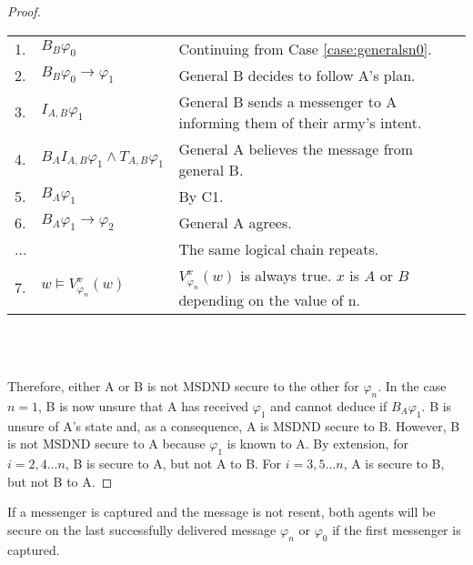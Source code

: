\begin{proof}
\begin{table}[H]
\centering
\small
\begin{tabularx}{\linewidth}{l l X}
1. & $B_{B} \varphi_0$ & Continuing from Case \ref{case:generalsn0}. \\
2. & $B_{B} \varphi_0 \rightarrow \varphi_1$ & General B decides to follow A's plan. \\
3. & $I_{A,B} \varphi_1$ & General B sends a messenger to A informing them of their army's intent. \\
4. & $B_{A}I_{A,B} \varphi_1 \wedge T_{A,B} \varphi_1$ & General A believes the message from general B. \\
5. & $B_{A}\varphi_1$ & By C1. \\
6. & $B_{A}\varphi_1 \rightarrow \varphi_2$ & General A agrees. \\
...& & The same logical chain repeats. \\
7. & $w \vDash V_{\varphi_n}^{x}(w)$ & $V_{\varphi_n}^{x}(w)$ is always true. $x$ is $A$ or $B$ depending on the value of n. %
\end{tabularx} \\~\\
\label{tab:twoarmiesproof2}
\end{table}

Therefore, either A or B is not MSDND secure to the other for $\varphi_n$.
In the case $n=1$, B is now unsure that A has received $\varphi_1$ and cannot deduce if $B_{A} \varphi_1$.
B is unsure of A's state and, as a consequence, A is MSDND secure to B.
However, B is not MSDND secure to A because $\varphi_1$ is known to A. By extension, for $i=2,4...n$, B is secure to A, but not A to B. For $i=3,5...n$, A is secure to B, but not B to A.
\end{proof}


\begin{thm}
If a messenger is captured and the message is not resent, both agents will be secure on the last successfully delivered message $\varphi_{n}$ or $\varphi_0$ if the first messenger is captured.
\label{thm:captured}
\end{thm}

